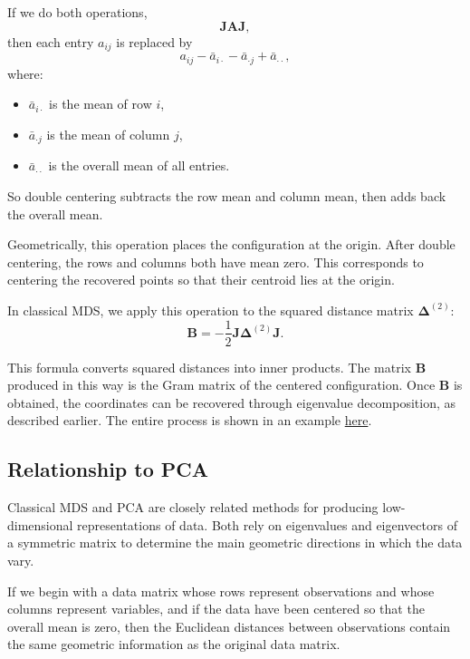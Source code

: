 If we do both operations,
\[
\mathbf{J}\mathbf{A}\mathbf{J},
\]
then each entry $a_{ij}$ is replaced by
\[
a_{ij}
- \bar{a}_{i\cdot}
- \bar{a}_{\cdot j}
+ \bar{a}_{\cdot\cdot},
\]
where:
\begin{itemize}
\item $\bar{a}_{i\cdot}$ is the mean of row $i$,
\item $\bar{a}_{\cdot j}$ is the mean of column $j$,
\item $\bar{a}_{\cdot\cdot}$ is the overall mean of all entries.
\end{itemize}

So double centering subtracts the row mean and column mean,
then adds back the overall mean.

\medskip

Geometrically, this operation places the configuration at the origin.
After double centering, the rows and columns both have mean zero.
This corresponds to centering the recovered points so that their centroid
lies at the origin.

\medskip

In classical MDS, we apply this operation to the squared
distance matrix $\mathbf{\Delta}^{(2)}$:
\[
\mathbf{B}
=
-\frac{1}{2}
\mathbf{J}
\mathbf{\Delta}^{(2)}
\mathbf{J}.
\]

This formula converts squared distances into inner products.
The matrix $\mathbf{B}$ produced in this way is the Gram matrix
of the centered configuration. Once $\mathbf{B}$ is obtained,
the coordinates can be recovered through eigenvalue decomposition, as described earlier. The entire process is shown in an example \hyperref[worked-mds]{here}.

\bigskip

\subsection{Relationship to PCA}

\medskip

Classical MDS and PCA are closely related
methods for producing low-dimensional representations of data. Both rely
on eigenvalues and eigenvectors of a symmetric matrix to determine the
main geometric directions in which the data vary.

\medskip

If we begin with a data matrix whose rows represent observations and whose
columns represent variables, and if the data have been centered so that the
overall mean is zero, then the Euclidean distances between observations
contain the same geometric information as the original data matrix.

